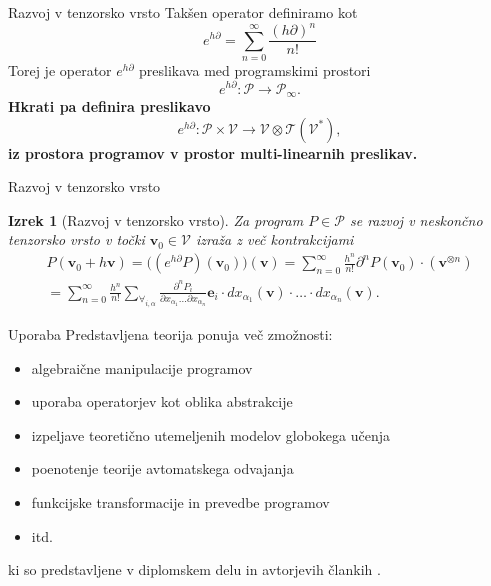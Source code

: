 \documentclass{beamer}
\newcommand{\T}{\mathcal{T}}
\newcommand{\VV}{\mathcal{V}}
\newcommand{\e}{\mathbf{e}}
\newcommand{\vv}{\mathbf{v}}
\newcommand{\dP}{\mathcal{P}}
\newcommand{\D}{\partial}
\newtheorem{izrek}{Izrek}[section]
\begin{document}
\begin{frame}{Razvoj v tenzorsko vrsto}
Takšen operator definiramo kot
\begin{equation*}
 	e^{h\D}=\sum\limits_{n=0}^{\infty}\frac{(h\D)^n}{n!}
 \end{equation*}
 Torej je operator $e^{h\D}$ preslikava med programskimi prostori
  \begin{equation*}
  	e^{h\D}:\dP\to\dP_\infty.
  \end{equation*}
 \textbf{Hkrati pa definira preslikavo}
   \begin{equation*}\label{eq:specProg}
   	e^{h\D}:\dP\times \VV\to \VV\otimes \T(\VV^*),
   \end{equation*}
\textbf{iz prostora programov v prostor multi-linearnih preslikav.}
\end{frame}

\begin{frame}{Razvoj v tenzorsko vrsto}

\begin{izrek}[Razvoj v tenzorsko vrsto]\label{izr:e^d}
	Za program $P\in\dP$  se razvoj v neskončno tenzorsko vrsto
  v točki $\vv_0\in \VV$ izraža z več kontrakcijami 
	\begin{multline*}\label{eq:tenzorVrsta}
	P(\vv_0+h\vv) = \Big((e^{h\D}P)(\vv_0)\Big)(\vv)
  = \sum_{n=0}^\infty\frac{h^n}{n!}\D^nP(\vv_0)\cdot (\vv^{\otimes n})\\
  = \sum_{n=0}^\infty \frac{h^n}{n!}\sum_{\forall_{i,\alpha}}\frac{\partial^nP_i}{\partial
 		    x_{\alpha_1}\ldots \partial x_{\alpha_n}}\e_i\cdot
 		  dx_{\alpha_1}(\vv)\cdot\ldots \cdot dx_{\alpha_n}(\vv).
	\end{multline*}
\end{izrek}

\end{frame}

\begin{frame}{Uporaba}
Predstavljena teorija ponuja več zmožnosti: 
\begin{itemize}
\item
algebraične manipulacije programov
\item
uporaba operatorjev kot oblika abstrakcije
\item
izpeljave teoretično utemeljenih modelov globokega učenja
\item
poenotenje teorije avtomatskega odvajanja
\item
funkcijske transformacije in prevedbe programov
\item
itd.
\end{itemize}
ki so predstavljene v diplomskem delu in avtorjevih člankih \cite{opCalProg,dC++Paper}.
\end{frame}
\end{document}
